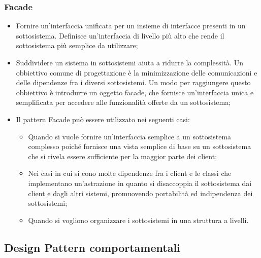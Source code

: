 \subsubsection{Facade} 
\begin{itemize}
\item {} Fornire un'interfaccia unificata per un insieme di interfacce presenti in un sottosistema. Definisce un'interfaccia di livello più alto che rende il sottosistema più semplice da utilizzare;
\item {} Suddividere un sistema in sottosistemi aiuta a ridurre la complessità. Un obbiettivo comune di progettazione è la minimizzazione delle comunicazioni e delle dipendenze fra i diversi sottosistemi. Un modo per raggiungere questo obbiettivo è introdurre un oggetto facade, che fornisce un'interfaccia unica e semplificata per accedere alle funzionalità offerte da un sottosistema;
\item {} Il pattern Facade può essere utilizzato nei seguenti casi:
\begin{itemize}
\item Quando si vuole fornire un'interfaccia semplice a un sottosistema complesso poiché fornisce una vista semplice di base su un sottosistema che si rivela essere sufficiente per la maggior parte dei client;
\item Nei casi in cui si cono molte dipendenze fra i client e le classi che implementano un'astrazione in quanto si disaccoppia il sottosistema dai client e dagli altri sistemi, promuovendo portabilità ed indipendenza dei sottosistemi;
\item Quando si vogliono organizzare i sottosistemi in una struttura a livelli.
\end{itemize}
\end{itemize}

\subsection{Design Pattern comportamentali} %
